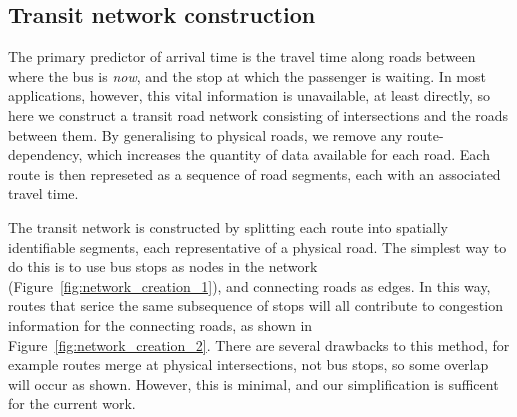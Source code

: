 \subsection{Transit network construction}
\label{sec:network_build}

The primary predictor of arrival time is 
the travel time along roads between where the bus is \emph{now},
and the stop at which the passenger is waiting.
In most applications, however, this vital information is unavailable,
at least directly,
so here we construct a transit road network consisting of intersections
and the roads between them.
By generalising to physical roads,
we remove any route-dependency,
which increases the quantity of data available for each road.
Each route is then represeted as a sequence of road segments,
each with an associated travel time.


The transit network is constructed by splitting each route
into spatially identifiable segments,
each representative of a physical road.
The simplest way to do this is to use bus stops as nodes in the network
(Figure~\ref{fig:network_creation_1}),
and connecting roads as edges.
In this way, routes that serice the same subsequence of stops
will all contribute to congestion information for the connecting roads,
as shown in Figure~\ref{fig:network_creation_2}.
There are several drawbacks to this method,
for example routes merge at physical intersections, not bus stops,
so some overlap will occur as shown.
However, this is minimal, and our simplification is sufficent for the current work.


